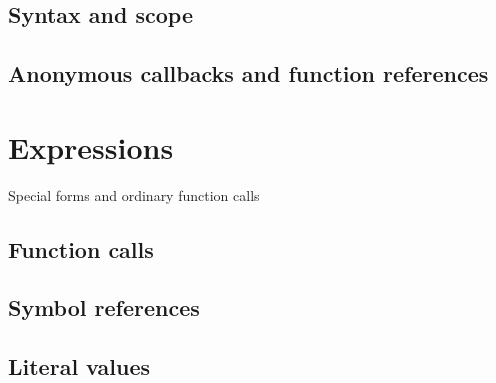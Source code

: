 \documentclass{article}
\theoremstyle{definition}
\begin{document}
\hypertarget{hsec:fcndef}{}
\label{form:fcndef}


\hypertarget{hsec:fcnref}{}
\label{form:fcnref}


\subsection{Syntax and scope}

\subsection{Anonymous callbacks and function references}

\pagebreak

\hypertarget{hsec:expressions}{}
\section{Expressions}
\label{sec:expressions}

Special forms and ordinary function calls

\hypertarget{hsec:function-call}{}
\subsection{Function calls}
\label{sec:function-call}

\hypertarget{hsec:symbol-ref}{}
\subsection{Symbol references}
\label{sec:symbol-ref}

\hypertarget{hsec:literals}{}
\subsection{Literal values}
\label{sec:literals}

\end{document}
